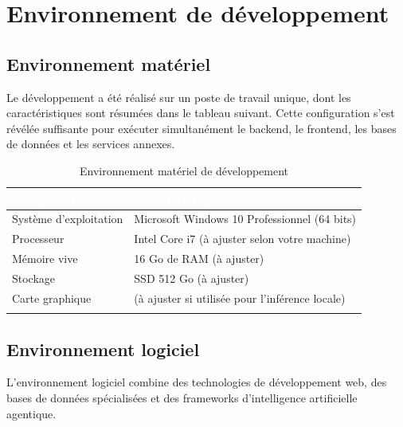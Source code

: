 \section{Environnement de développement}

\subsection{Environnement matériel}

Le développement a été réalisé sur un poste de travail unique, dont les caractéristiques sont résumées dans le tableau suivant. Cette configuration s'est révélée suffisante pour exécuter simultanément le backend, le frontend, les bases de données et les services annexes.

\begin{longtable}{|P{4.5cm}|P{9.5cm}|}
\hline
{}
\textcolor{white}{\textbf{Composant}} &
\textcolor{white}{\textbf{Caractéristiques}} \\
\hline
\endhead
\hline
\endfoot
\hline
\endlastfoot
Système d'exploitation & Microsoft Windows 10 Professionnel (64 bits) \\
\hline
Processeur & Intel Core i7 (à ajuster selon votre machine) \\
\hline
Mémoire vive & 16 Go de RAM (à ajuster) \\
\hline
Stockage & SSD 512 Go (à ajuster) \\
\hline
Carte graphique & (à ajuster si utilisée pour l'inférence locale) \\
\hline
\caption{Environnement matériel de développement}
\label{tab:env-materiel-chap2}
\end{longtable}

\subsection{Environnement logiciel}

L'environnement logiciel combine des technologies de développement web, des bases de données spécialisées et des frameworks d'intelligence artificielle agentique.

